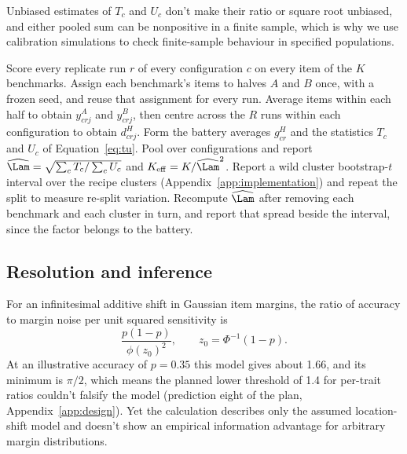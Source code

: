 Unbiased estimates of $T_c$ and $U_c$ don't make their ratio or square root unbiased, and either pooled sum can be nonpositive in a finite sample, which is why we use calibration simulations to check finite-sample behaviour in specified populations.

\begin{algorithm}[t]
\caption{SNAP measurement recipe for a fixed battery of $K$ benchmarks scored on $R$ replicate runs per configuration. The primary analysis below used a random frozen split and checked a passage-aware split, and the registered test kept passage-linked items in one half.}
\label{alg:snap}
\begin{algorithmic}[1]
\STATE Score every replicate run $r$ of every configuration $c$ on every item of the $K$ benchmarks.
\STATE Assign each benchmark's items to halves $A$ and $B$ once, with a frozen seed, and reuse that assignment for every run.
\STATE Average items within each half to obtain $y^A_{crj}$ and $y^B_{crj}$, then centre across the $R$ runs within each configuration to obtain $d^H_{crj}$.
\STATE Form the battery averages $g^H_{cr}$ and the statistics $T_c$ and $U_c$ of Equation~\ref{eq:tu}.
\STATE Pool over configurations and report $\widehat\Lam=\sqrt{\sum_c T_c/\sum_c U_c}$ and $K_{\mathrm{eff}}=K/\widehat\Lam^2$.
\STATE Report a wild cluster bootstrap-$t$ interval over the recipe clusters (Appendix~\ref{app:implementation}) and repeat the split to measure re-split variation.
\STATE Recompute $\widehat\Lam$ after removing each benchmark and each cluster in turn, and report that spread beside the interval, since the factor belongs to the battery.
\end{algorithmic}
\end{algorithm}


\subsection{Resolution and inference}
For an infinitesimal additive shift in Gaussian item margins, the ratio of accuracy to margin noise per unit squared sensitivity is
\begin{equation}
\frac{p(1-p)}{\phi(z_0)^2},\qquad z_0=\Phi^{-1}(1-p).
\label{eq:information}
\end{equation}
At an illustrative accuracy of $p=0.35$ this model gives about 1.66, and its minimum is $\pi/2$, which means the planned lower threshold of 1.4 for per-trait ratios couldn't falsify the model (prediction eight of the plan, Appendix~\ref{app:design}). Yet the calculation describes only the assumed location-shift model and doesn't show an empirical information advantage for arbitrary margin distributions.

